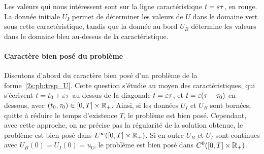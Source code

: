 \usetikzlibrary{decorations.markings}
\begin{center}
\end{center}

\noindent
Les valeurs qui nous intéressent sont sur la ligne caractéristique $t = \varepsilon\tau$, en rouge. La donnée initiale $U_I$ permet de déterminer les valeurs de $U$ dans le domaine vert sous cette caractéristique, tandis que la donnée au bord $U_B$ détermine les valeurs dans le domaine bleu au-dessus de la caractéristique. 


\paragraph{Caractère bien posé du problème \\}
Discutons d'abord du caractère bien posé d'un problème de la forme~\eqref{2s:pb:trsp_U}. Cette question s'étudie au moyen des caractéristiques, qui s'écrivent $t = t_0 + \varepsilon\tau$ au-dessus de la diagonale $t = \varepsilon\tau$, et $t = \varepsilon(\tau - \tau_0)$ en-dessous, avec $(t_0,\tau_0) \in [0,T] \times \mathbb{R}_+$. Ainsi, si les données $U_I$ et $U_B$ sont bornées, quitte à réduire le temps d'existence $T$, le problème est bien posé. Cependant, avec cette approche, on ne précise pas la régularité de la solution obtenue, le problème est bien posé dans $L^{\infty}([0,T] \times \mathbb{R}_+)$. Si en outre $U_B$ et $U_I$ sont continues avec $U_B(0) = U_I(0) = u_0$, le problème est bien posé dans $C^0([0,T] \times \mathbb{R}_+)$. 

